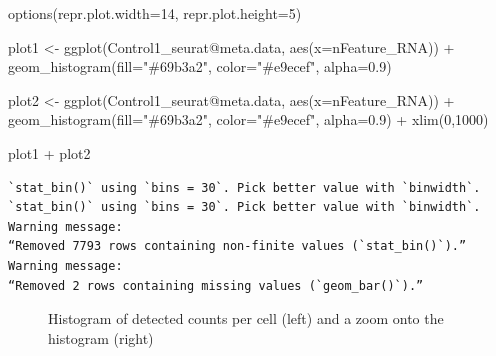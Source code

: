 \documentclass[
  letterpaper,
  DIV=11,
  numbers=noendperiod]{scrartcl}
\newenvironment{Shaded}{}{}
\newcommand{\AttributeTok}[1]{\textcolor[rgb]{0.49,0.56,0.16}{#1}}
\newcommand{\DecValTok}[1]{\textcolor[rgb]{0.25,0.63,0.44}{#1}}
\newcommand{\FloatTok}[1]{\textcolor[rgb]{0.25,0.63,0.44}{#1}}
\newcommand{\FunctionTok}[1]{\textcolor[rgb]{0.02,0.16,0.49}{#1}}
\newcommand{\NormalTok}[1]{#1}
\newcommand{\OtherTok}[1]{\textcolor[rgb]{0.00,0.44,0.13}{#1}}
\newcommand{\SpecialCharTok}[1]{\textcolor[rgb]{0.25,0.44,0.63}{#1}}
\newcommand{\StringTok}[1]{\textcolor[rgb]{0.25,0.44,0.63}{#1}}
\begin{document}
\begin{Shaded}
\begin{Highlighting}[]
\FunctionTok{options}\NormalTok{(}\AttributeTok{repr.plot.width=}\DecValTok{14}\NormalTok{, }\AttributeTok{repr.plot.height=}\DecValTok{5}\NormalTok{)}

\NormalTok{plot1 }\OtherTok{\textless{}{-}} \FunctionTok{ggplot}\NormalTok{(Control1\_seurat}\SpecialCharTok{@}\NormalTok{meta.data, }\FunctionTok{aes}\NormalTok{(}\AttributeTok{x=}\NormalTok{nFeature\_RNA)) }\SpecialCharTok{+} 
     \FunctionTok{geom\_histogram}\NormalTok{(}\AttributeTok{fill=}\StringTok{"\#69b3a2"}\NormalTok{, }\AttributeTok{color=}\StringTok{"\#e9ecef"}\NormalTok{, }\AttributeTok{alpha=}\FloatTok{0.9}\NormalTok{)}

\NormalTok{plot2 }\OtherTok{\textless{}{-}} \FunctionTok{ggplot}\NormalTok{(Control1\_seurat}\SpecialCharTok{@}\NormalTok{meta.data, }\FunctionTok{aes}\NormalTok{(}\AttributeTok{x=}\NormalTok{nFeature\_RNA)) }\SpecialCharTok{+} 
     \FunctionTok{geom\_histogram}\NormalTok{(}\AttributeTok{fill=}\StringTok{"\#69b3a2"}\NormalTok{, }\AttributeTok{color=}\StringTok{"\#e9ecef"}\NormalTok{, }\AttributeTok{alpha=}\FloatTok{0.9}\NormalTok{) }\SpecialCharTok{+}
     \FunctionTok{xlim}\NormalTok{(}\DecValTok{0}\NormalTok{,}\DecValTok{1000}\NormalTok{)}


\NormalTok{plot1 }\SpecialCharTok{+}\NormalTok{ plot2}
\end{Highlighting}
\end{Shaded}

\begin{verbatim}
`stat_bin()` using `bins = 30`. Pick better value with `binwidth`.
`stat_bin()` using `bins = 30`. Pick better value with `binwidth`.
Warning message:
“Removed 7793 rows containing non-finite values (`stat_bin()`).”
Warning message:
“Removed 2 rows containing missing values (`geom_bar()`).”
\end{verbatim}

\begin{figure}[H]


\caption{\label{fig-genecounts}Histogram of detected counts per cell
(left) and a zoom onto the histogram (right)}

\end{figure}%
\end{document}
